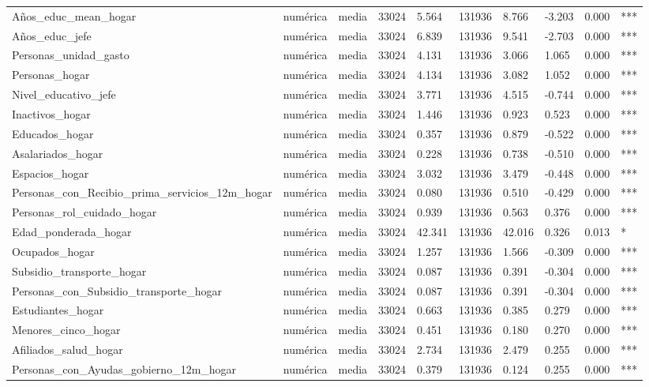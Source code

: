 \begin{longtable}[t]{llllllllll}
Años\_educ\_mean\_hogar & numérica & media & 33024 & 5.564 & 131936 & 8.766 & -3.203 & 0.000 & ***\\
Años\_educ\_jefe & numérica & media & 33024 & 6.839 & 131936 & 9.541 & -2.703 & 0.000 & ***\\
Personas\_unidad\_gasto & numérica & media & 33024 & 4.131 & 131936 & 3.066 & 1.065 & 0.000 & ***\\
Personas\_hogar & numérica & media & 33024 & 4.134 & 131936 & 3.082 & 1.052 & 0.000 & ***\\
Nivel\_educativo\_jefe & numérica & media & 33024 & 3.771 & 131936 & 4.515 & -0.744 & 0.000 & ***\\
Inactivos\_hogar & numérica & media & 33024 & 1.446 & 131936 & 0.923 & 0.523 & 0.000 & ***\\
Educados\_hogar & numérica & media & 33024 & 0.357 & 131936 & 0.879 & -0.522 & 0.000 & ***\\
Asalariados\_hogar & numérica & media & 33024 & 0.228 & 131936 & 0.738 & -0.510 & 0.000 & ***\\
Espacios\_hogar & numérica & media & 33024 & 3.032 & 131936 & 3.479 & -0.448 & 0.000 & ***\\
Personas\_con\_Recibio\_prima\_servicios\_12m\_hogar & numérica & media & 33024 & 0.080 & 131936 & 0.510 & -0.429 & 0.000 & ***\\
Personas\_rol\_cuidado\_hogar & numérica & media & 33024 & 0.939 & 131936 & 0.563 & 0.376 & 0.000 & ***\\
Edad\_ponderada\_hogar & numérica & media & 33024 & 42.341 & 131936 & 42.016 & 0.326 & 0.013 & *\\
Ocupados\_hogar & numérica & media & 33024 & 1.257 & 131936 & 1.566 & -0.309 & 0.000 & ***\\
Subsidio\_transporte\_hogar & numérica & media & 33024 & 0.087 & 131936 & 0.391 & -0.304 & 0.000 & ***\\
Personas\_con\_Subsidio\_transporte\_hogar & numérica & media & 33024 & 0.087 & 131936 & 0.391 & -0.304 & 0.000 & ***\\
Estudiantes\_hogar & numérica & media & 33024 & 0.663 & 131936 & 0.385 & 0.279 & 0.000 & ***\\
Menores\_cinco\_hogar & numérica & media & 33024 & 0.451 & 131936 & 0.180 & 0.270 & 0.000 & ***\\
Afiliados\_salud\_hogar & numérica & media & 33024 & 2.734 & 131936 & 2.479 & 0.255 & 0.000 & ***\\
Personas\_con\_Ayudas\_gobierno\_12m\_hogar & numérica & media & 33024 & 0.379 & 131936 & 0.124 & 0.255 & 0.000 & ***\\

\end{longtable}
